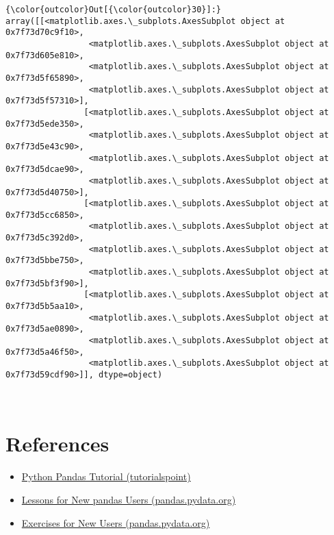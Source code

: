 \documentclass[11pt]{article}
\providecommand{\tightlist}{%
      \setlength{\itemsep}{0pt}\setlength{\parskip}{0pt}}
\begin{document}
\begin{Verbatim}[commandchars=\\\{\}]
{\color{outcolor}Out[{\color{outcolor}30}]:} array([[<matplotlib.axes.\_subplots.AxesSubplot object at 0x7f73d70c9f10>,
                 <matplotlib.axes.\_subplots.AxesSubplot object at 0x7f73d605e810>,
                 <matplotlib.axes.\_subplots.AxesSubplot object at 0x7f73d5f65890>,
                 <matplotlib.axes.\_subplots.AxesSubplot object at 0x7f73d5f57310>],
                [<matplotlib.axes.\_subplots.AxesSubplot object at 0x7f73d5ede350>,
                 <matplotlib.axes.\_subplots.AxesSubplot object at 0x7f73d5e43c90>,
                 <matplotlib.axes.\_subplots.AxesSubplot object at 0x7f73d5dcae90>,
                 <matplotlib.axes.\_subplots.AxesSubplot object at 0x7f73d5d40750>],
                [<matplotlib.axes.\_subplots.AxesSubplot object at 0x7f73d5cc6850>,
                 <matplotlib.axes.\_subplots.AxesSubplot object at 0x7f73d5c392d0>,
                 <matplotlib.axes.\_subplots.AxesSubplot object at 0x7f73d5bbe750>,
                 <matplotlib.axes.\_subplots.AxesSubplot object at 0x7f73d5bf3f90>],
                [<matplotlib.axes.\_subplots.AxesSubplot object at 0x7f73d5b5aa10>,
                 <matplotlib.axes.\_subplots.AxesSubplot object at 0x7f73d5ae0890>,
                 <matplotlib.axes.\_subplots.AxesSubplot object at 0x7f73d5a46f50>,
                 <matplotlib.axes.\_subplots.AxesSubplot object at 0x7f73d59cdf90>]], dtype=object)
\end{Verbatim}
            
    \begin{center}
    \end{center}
    { \hspace*{\fill} \\}
    
    \section{References}\label{references}

\begin{itemize}
\tightlist
\item
  \href{https://www.tutorialspoint.com/python_pandas/index.htm}{Python
  Pandas Tutorial (tutorialspoint)}
\item
  \href{https://pandas.pydata.org/pandas-docs/stable/tutorials.html\#lessons-for-new-pandas-users}{Lessons
  for New pandas Users (pandas.pydata.org)}
\item
  \href{https://pandas.pydata.org/pandas-docs/stable/tutorials.html\#exercises-for-new-users}{Exercises
  for New Users (pandas.pydata.org)}
\end{itemize}


    
    
    
    
\end{document}
